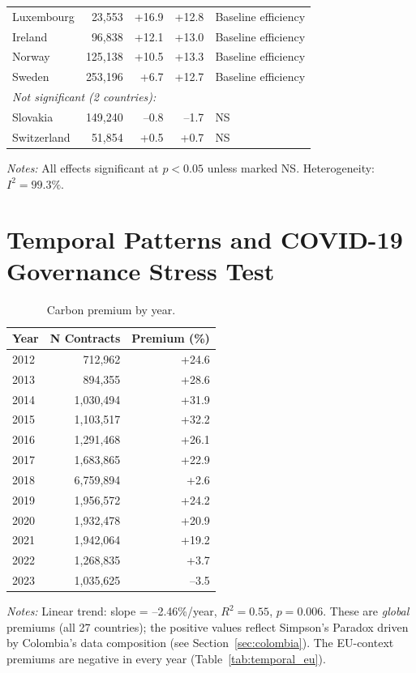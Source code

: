 \documentclass[11pt]{article}
\newcommand{\tabnoteblock}[1]{%
    \par\vspace{0.45em}%
    \begin{minipage}{0.98\linewidth}
    \footnotesize\raggedright #1
    \end{minipage}\par
}
\newcommand{\tabnotes}[1]{\tabnoteblock{\textit{Notes:} #1}}
\begin{document}
\begin{table}[H]
\begin{tabular}{lrrrl}
Luxembourg & 23,553 & +16.9 & +12.8 & Baseline efficiency \\
Ireland & 96,838 & +12.1 & +13.0 & Baseline efficiency \\
Norway & 125,138 & +10.5 & +13.3 & Baseline efficiency \\
Sweden & 253,196 & +6.7 & +12.7 & Baseline efficiency \\
\midrule
\multicolumn{5}{l}{\textit{Not significant (2 countries):}} \\
Slovakia & 149,240 & --0.8 & --1.7 & NS \\
Switzerland & 51,854 & +0.5 & +0.7 & NS \\
\bottomrule
\end{tabular}

\tabnotes{All effects significant at $p < 0.05$ unless marked NS. Heterogeneity: $I^2 = 99.3\%$.
}
\end{table}

\section{Temporal Patterns and COVID-19 Governance Stress Test}

\begin{table}[H]
\centering
\caption{Carbon premium by year.}
\label{tab:temporal}
\begin{tabular}{lrr}
\toprule
\textbf{Year} & \textbf{N Contracts} & \textbf{Premium (\%)} \\
\midrule
2012 & 712,962 & +24.6 \\
2013 & 894,355 & +28.6 \\
2014 & 1,030,494 & +31.9 \\
2015 & 1,103,517 & +32.2 \\
2016 & 1,291,468 & +26.1 \\
2017 & 1,683,865 & +22.9 \\
2018 & 6,759,894 & +2.6 \\
2019 & 1,956,572 & +24.2 \\
2020 & 1,932,478 & +20.9 \\
2021 & 1,942,064 & +19.2 \\
2022 & 1,268,835 & +3.7 \\
2023 & 1,035,625 & --3.5 \\
\bottomrule
\end{tabular}

\tabnotes{Linear trend: slope = --2.46\%/year, $R^2 = 0.55$, $p = 0.006$. These are \textit{global} premiums (all 27 countries); the positive values reflect Simpson's Paradox driven by Colombia's data composition (see Section~\ref{sec:colombia}). The EU-context premiums are negative in every year (Table~\ref{tab:temporal_eu}).
}
\end{table}
\end{document}
